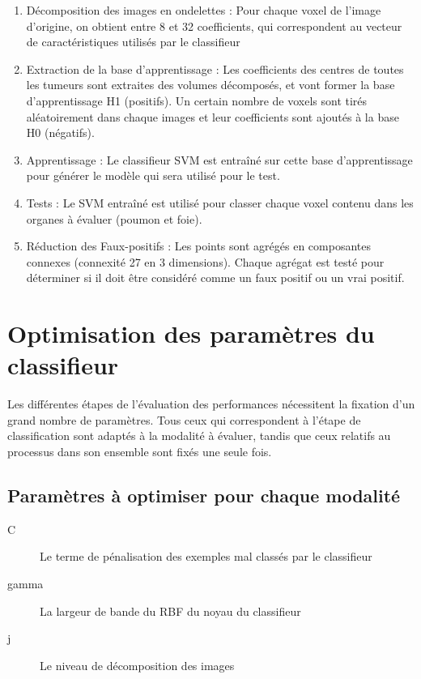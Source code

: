 \begin{enumerate}
 \item Décomposition des images en ondelettes : Pour chaque voxel de l'image d'origine, on obtient entre 8 et 32 coefficients, qui correspondent au vecteur de caractéristiques utilisés par le classifieur
 \item Extraction de la base d'apprentissage : Les coefficients des centres de toutes les tumeurs sont extraites des volumes décomposés, et vont former la base d'apprentissage H1 (positifs). Un certain nombre de voxels sont tirés aléatoirement dans chaque images et leur coefficients sont ajoutés à la base H0 (négatifs).
 \item Apprentissage : Le classifieur SVM est entraîné sur cette base d'apprentissage pour générer le modèle qui sera utilisé pour le test.
 \item Tests : Le SVM entraîné est utilisé pour classer chaque voxel contenu dans les organes à évaluer (poumon et foie).
 \item Réduction des Faux-positifs : Les points sont agrégés en composantes connexes (connexité 27 en 3 dimensions). Chaque agrégat est testé pour déterminer si il doit être considéré comme un faux positif ou un vrai positif.
\end{enumerate}

\section{Optimisation des paramètres du classifieur}
\label{lab:optim}

Les différentes étapes de l'évaluation des performances nécessitent la fixation d'un grand nombre de paramètres. Tous ceux qui correspondent à l'étape de classification sont adaptés à la modalité à évaluer, tandis que ceux relatifs au processus dans son ensemble sont fixés une seule fois.

\subsection{Paramètres à optimiser pour chaque modalité}

\begin{description}
 \item[C] Le terme de pénalisation des exemples mal classés par le classifieur
 \item[gamma] La largeur de bande du RBF du noyau du classifieur
 \item[j] Le niveau de décomposition des images 
\end{description}


